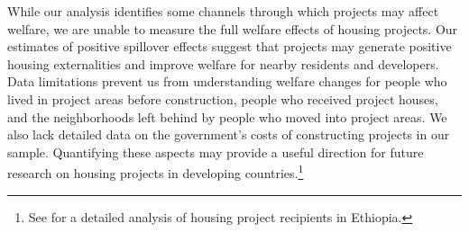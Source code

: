 \documentclass[12pt]{article}
\newcommand{\rv}{}
\begin{document}

\rv{While our analysis identifies some channels through which projects may affect welfare, we are unable to measure the full welfare effects of housing projects.  Our estimates of positive spillover effects suggest that projects may generate positive housing externalities and improve welfare for nearby residents and developers.  Data limitations prevent us from understanding welfare changes for people who lived in project areas before construction, people who received project houses, and the neighborhoods left behind by people who moved into project areas.  We also lack detailed data on the government's costs of constructing projects in our sample.  Quantifying these aspects may provide a useful direction for future research on housing projects in developing countries.}\footnote{ \rv{See \cite{franklin2019demand} for a detailed analysis of housing project recipients in Ethiopia.} }


\end{document}
